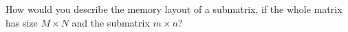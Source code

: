   \label{ex:submatrix}
  How would you describe the memory layout of a submatrix,
  if the whole matrix has size $M\times N$ and the submatrix $m\times n$?
